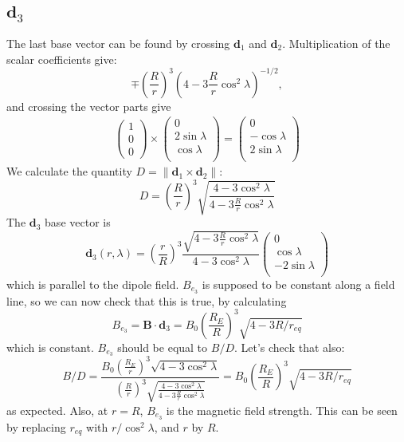 \documentclass[11pt]{article}
\begin{document}
\subsection{$\mathbf{d}_3$}
The last base vector can be found by crossing $\mathbf{d}_1$ and $\mathbf{d}_2$. Multiplication of the scalar coefficients give:
\begin{equation}
\mp\left(\frac{R}{r}\right)^{3}\left(4 - 3\frac{R}{r}\cos^2\lambda\right)^{-1/2}, \nonumber
\end{equation}
and crossing the vector parts give
\begin{align}
\left( \begin{array}{c}
1\\
0\\
0\end{array} \right) \times \left(\begin{array}{c}
0\\
2\sin \lambda\\
\cos \lambda\\
\end{array}\right) = \left(\begin{array}{c}
0\\
-\cos \lambda\\
2\sin \lambda\\
\end{array}\right)
\end{align}
We calculate the quantity $D = \|\mathbf{d}_1\times\mathbf{d}_2\|$:
\begin{equation}
D =\left(\frac{R}{r}\right)^{3}\sqrt{\frac{4 - 3\cos^2\lambda}{4 - 3\frac{R}{r}\cos^2\lambda}}
\end{equation}
The $\mathbf{d}_3$ base vector is
\begin{equation}
\boxed{\mathbf{d}_3(r, \lambda) = \left(\frac{r}{R}\right)^3\frac{\sqrt{4 - 3\frac{R}{r}\cos^2\lambda}}{4 - 3\cos^2\lambda}\left(\begin{array}{c}
0\\
\cos \lambda\\
-2\sin \lambda\\
\end{array}\right)}
\end{equation}
which is parallel to the dipole field. $B_{e_3}$ is supposed to be constant along a field line, so we can now check that this is true, by calculating
\begin{equation}
B_{e_3} = \mathbf{B}\cdot\mathbf{d}_3 = B_0\left(\frac{R_E}{R}\right)^3\sqrt{4-3R/r_{eq}}
\end{equation}
which is constant. $B_{e_3}$ should be equal to $B/D$. Let's check that also:
\begin{equation}
B/D = \frac{B_0\left(\frac{R_E}{r}\right)^3\sqrt{4 - 3\cos^2\lambda}} {\left(\frac{R}{r}\right)^3\sqrt{\frac{4 - 3\cos^2\lambda}{4 - 3\frac{R}{r}\cos^2\lambda}}} = B_0\left(\frac{R_E}{R}\right)^3\sqrt{4-3R/r_{eq}}
\end{equation}
as expected. Also, at $r = R$, $B_{e_3}$ is the magnetic field strength. This can be seen by replacing $r_{eq}$ with $r/\cos^2\lambda$, and $r$ by $R$. 




\end{document}
